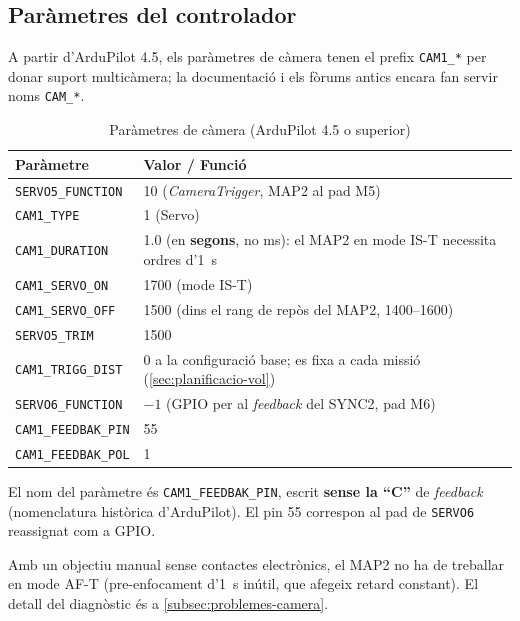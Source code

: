 \subsection{Paràmetres del controlador}

A partir d'ArduPilot 4.5, els paràmetres de càmera tenen el prefix \texttt{CAM1\_*} per donar suport multicàmera; la documentació i els fòrums antics encara fan servir noms \texttt{CAM\_*}.

\begin{table}[H]
    \centering
    \caption{Paràmetres de càmera (ArduPilot 4.5 o superior)}
    \label{tab:params-camera}
    \begin{tabular}{lP{9.5cm}}
        \toprule
        Paràmetre & Valor / Funció \\
        \midrule
        \texttt{SERVO5\_FUNCTION} & 10 (\emph{CameraTrigger}, MAP2 al pad M5) \\
        \texttt{CAM1\_TYPE} & 1 (Servo) \\
        \texttt{CAM1\_DURATION} & 1.0 (en \textbf{segons}, no ms): el MAP2 en mode IS-T necessita ordres d'1~s \\
        \texttt{CAM1\_SERVO\_ON} & 1700 (mode IS-T) \\
        \texttt{CAM1\_SERVO\_OFF} & 1500 (dins el rang de repòs del MAP2, 1400--1600) \\
        \texttt{SERVO5\_TRIM} & 1500 \\
        \texttt{CAM1\_TRIGG\_DIST} & 0 a la configuració base; es fixa a cada missió (\cref{sec:planificacio-vol}) \\
        \texttt{SERVO6\_FUNCTION} & $-1$ (GPIO per al \emph{feedback} del SYNC2, pad M6) \\
        \texttt{CAM1\_FEEDBAK\_PIN} & 55 \\
        \texttt{CAM1\_FEEDBAK\_POL} & 1 \\
        \bottomrule
    \end{tabular}
\end{table}

El nom del paràmetre és \texttt{CAM1\_FEEDBAK\_PIN}, escrit \textbf{sense la ``C''} de \emph{feedback} (nomenclatura històrica d'ArduPilot). El pin 55 correspon al pad de \texttt{SERVO6} reassignat com a GPIO.

Amb un objectiu manual sense contactes electrònics, el MAP2 no ha de treballar en mode AF-T (pre-enfocament d'1~s inútil, que afegeix retard constant). El detall del diagnòstic és a \cref{subsec:problemes-camera}.

